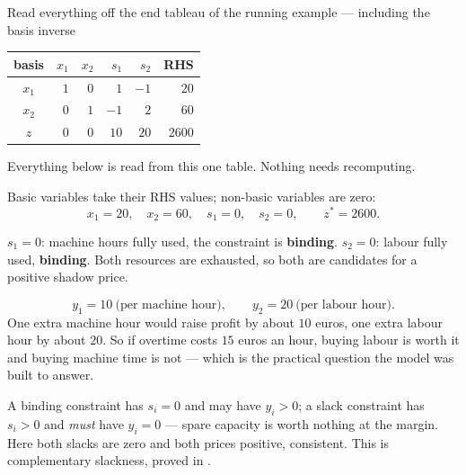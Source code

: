 \begin{worked}{Read everything off the end tableau of the running example --- including the basis inverse}
\begin{center}\footnotesize
\begin{tabular}{c|rrrr|r}
  \hline
  basis & $x_{1}$ & $x_{2}$ & $s_{1}$ & $s_{2}$ & RHS\\
  \hline
  $x_{1}$ & $1$ & $0$ & $1$ & $-1$ & $20$\\
  $x_{2}$ & $0$ & $1$ & $-1$ & $2$ & $60$\\
  \hline
  $z$ & $0$ & $0$ & $10$ & $20$ & $2600$\\
  \hline
\end{tabular}
\end{center}
Everything below is read from this one table. Nothing needs recomputing.

Basic variables take their RHS values; non-basic variables are zero:
\[
  x_{1}=20,\quad x_{2}=60,\quad s_{1}=0,\quad s_{2}=0,
  \qquad
  z^{*}=2600 .
\]

$s_{1}=0$: machine hours fully used, the constraint is \textbf{binding}.
$s_{2}=0$: labour fully used, \textbf{binding}. Both resources are
exhausted, so both are candidates for a positive shadow price.

\[
  y_{1}=10\ \text{(per machine hour)},
  \qquad
  y_{2}=20\ \text{(per labour hour)} .
\]
One extra machine hour would raise profit by about $10$ euros, one extra
labour hour by about $20$. So if overtime costs $15$ euros an hour, buying
labour is worth it and buying machine time is not --- which is the practical
question the model was built to answer.

A binding constraint has $s_{i}=0$ and may have $y_{i}>0$; a slack
constraint has $s_{i}>0$ and \emph{must} have $y_{i}=0$ --- spare capacity
is worth nothing at the margin. Here both slacks are zero and both prices
positive, consistent. This is complementary slackness, proved in .


\end{worked}
